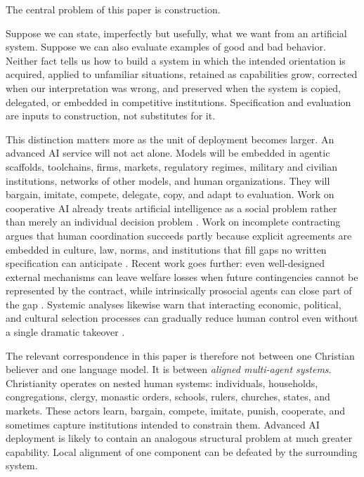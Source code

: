 \documentclass[11pt]{article}
\begin{document}
The central problem of this paper is construction.

Suppose we can state, imperfectly but usefully, what we want from an artificial system. Suppose we can also evaluate examples of good and bad behavior. Neither fact tells us how to build a system in which the intended orientation is acquired, applied to unfamiliar situations, retained as capabilities grow, corrected when our interpretation was wrong, and preserved when the system is copied, delegated, or embedded in competitive institutions. Specification and evaluation are inputs to construction, not substitutes for it.

This distinction matters more as the unit of deployment becomes larger. An advanced AI service will not act alone. Models will be embedded in agentic scaffolds, toolchains, firms, markets, regulatory regimes, military and civilian institutions, networks of other models, and human organizations. They will bargain, imitate, compete, delegate, copy, and adapt to evaluation. Work on cooperative AI already treats artificial intelligence as a social problem rather than merely an individual decision problem \parencite{dafoe2021cooperative}. Work on incomplete contracting argues that human coordination succeeds partly because explicit agreements are embedded in culture, law, norms, and institutions that fill gaps no written specification can anticipate \parencite{hadfieldmenell2019incomplete}. Recent work goes further: even well-designed external mechanisms can leave welfare losses when future contingencies cannot be represented by the contract, while intrinsically prosocial agents can close part of the gap \parencite{huang2026mechanism}. Systemic analyses likewise warn that interacting economic, political, and cultural selection processes can gradually reduce human control even without a single dramatic takeover \parencite{kulveit2025gradual}.

The relevant correspondence in this paper is therefore not between one Christian believer and one language model. It is between \emph{aligned multi-agent systems}. Christianity operates on nested human systems: individuals, households, congregations, clergy, monastic orders, schools, rulers, churches, states, and markets. These actors learn, bargain, compete, imitate, punish, cooperate, and sometimes capture institutions intended to constrain them. Advanced AI deployment is likely to contain an analogous structural problem at much greater capability. Local alignment of one component can be defeated by the surrounding system.
\end{document}
